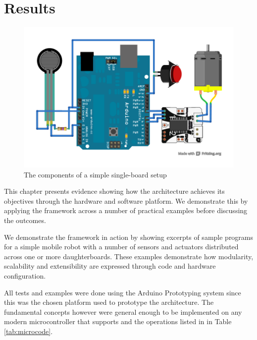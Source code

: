 \chapter{Results} 
\label{chap:results}

\begin{figure}
  \begin{center}
    \includegraphics[width=1.0\columnwidth]{Figures/simple-example.pdf}
    \caption{The components of a simple single-board \xten setup} \label{fig:singleboard}
  \end{center}
\end{figure}

This chapter presents evidence showing how the \xten architecture achieves its objectives through the hardware and software platform. We demonstrate this by applying the framework across a number of practical examples before discussing the outcomes.

 We demonstrate the framework in action by showing excerpts of sample programs for a simple mobile robot with a number of sensors and actuators distributed across one or more daughterboards. These examples demonstrate how modularity, scalability and extensibility are expressed through code and hardware configuration.
 
All tests and examples were done using the Arduino Prototyping system since this was the chosen platform used to prototype the \xten architecture. The fundamental concepts however were general enough to be implemented on any modern microcontroller that supports \iic and the operations listed in in Table \ref{tab:microcode}.

